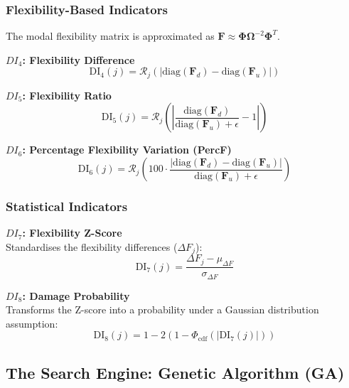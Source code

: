 \documentclass[preprint,12pt]{elsarticle}
\begin{document}
\subsubsection{Flexibility-Based Indicators}
The modal flexibility matrix is approximated as $\mathbf{F} \approx \boldsymbol{\Phi} \boldsymbol{\Omega}^{-2} \boldsymbol{\Phi}^T$.

\textbf{$DI_4$: Flexibility Difference} \\
\begin{equation}
    \text{DI}_4(j) = \mathcal{R}_j \left( | \text{diag}(\mathbf{F}_d) - \text{diag}(\mathbf{F}_u) | \right)
\end{equation}

\textbf{$DI_5$: Flexibility Ratio} \\
\begin{equation}
    \text{DI}_5(j) = \mathcal{R}_j \left( \left| \frac{\text{diag}(\mathbf{F}_d)}{\text{diag}(\mathbf{F}_u) + \epsilon} - 1 \right| \right)
\end{equation}

\textbf{$DI_6$: Percentage Flexibility Variation (PercF)} \\
\begin{equation}
    \text{DI}_6(j) = \mathcal{R}_j \left( 100 \cdot \frac{| \text{diag}(\mathbf{F}_d) - \text{diag}(\mathbf{F}_u) |}{\text{diag}(\mathbf{F}_u) + \epsilon} \right)
\end{equation}

\subsubsection{Statistical Indicators}

\textbf{$DI_7$: Flexibility Z-Score} \\
Standardises the flexibility differences ($\Delta F_j$):
\begin{equation}
    \text{DI}_7(j) = \frac{\Delta F_j - \mu_{\Delta F}}{\sigma_{\Delta F}}
\end{equation}

\textbf{$DI_8$: Damage Probability} \\
Transforms the Z-score into a probability under a Gaussian distribution assumption:
\begin{equation}
    \text{DI}_8(j) = 1 - 2\left( 1 - \Phi_{\text{cdf}}(|\text{DI}_7(j)|) \right)
\end{equation}

\subsection{The Search Engine: Genetic Algorithm (GA)}
\end{document}
